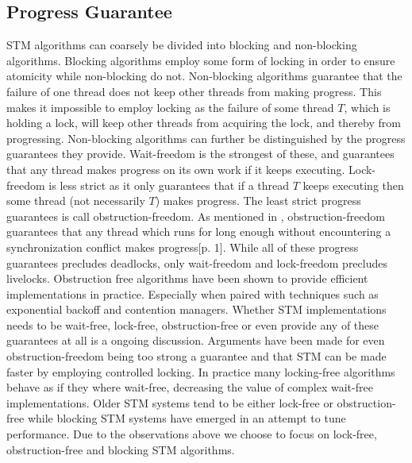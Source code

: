 \subsection{Progress Guarantee}
\ac{STM} algorithms can coarsely be divided into blocking and non-blocking algorithms\cite[p. 47]{harris2010transactional}. Blocking algorithms employ some form of locking in order to ensure atomicity while non-blocking do not\cite[p. 59]{herlihy2012art}. Non-blocking algorithms guarantee that the failure of one thread does not keep other threads from making progress\cite[p. 47]{harris2010transactional}\cite[p. 142]{herlihy1991wait}\cite[p. 59]{herlihy2012art}. This  makes it impossible to employ locking as the failure of some thread $T$, which is holding a lock, will keep other threads from acquiring the lock, and thereby from progressing. Non-blocking algorithms can further be distinguished by the progress guarantees they provide. Wait-freedom is the strongest of these, and guarantees that any thread makes progress on its own work if it keeps executing\cite[p. 124]{herlihy1991wait}\cite[p. 59]{herlihy2012art}. Lock-freedom is less strict as it only guarantees that if a thread $T$ keeps executing then some thread (not necessarily $T$) makes progress\cite[p. 47]{harris2010transactional}\cite[p. 60]{herlihy2012art}. The least strict progress guarantees is call obstruction-freedom\cite[p. 47]{harris2010transactional}\cite{herlihy2003obstruction}\cite[p. 61]{herlihy2012art}. As mentioned in , obstruction-freedom guarantees that any thread which runs for long enough without encountering a synchronization conflict makes progress\cite{herlihy2003obstruction}[p. 1]. While all of these progress guarantees precludes deadlocks, only wait-freedom and lock-freedom precludes livelocks\cite[p. 47]{harris2010transactional}. Obstruction free algorithms have been shown to provide efficient implementations in practice\cite[p. 61]{herlihy2012art}. Especially when paired with techniques such as exponential backoff\cite[p. 147]{herlihy2012art} and contention managers\cite[p. 51]{harris2010transactional}.  Whether \ac{STM} implementations needs to be wait-free, lock-free, obstruction-free or even provide any of these guarantees at all is a ongoing discussion. Arguments have been made for even obstruction-freedom being too strong a guarantee and that \ac{STM} can be made faster by employing controlled locking\cite{ennals2006software}. In practice many locking-free algorithms behave as if they where wait-free\cite{alistarh2014lock}, decreasing the value of complex wait-free implementations. Older \ac{STM} systems tend to be either lock-free or obstruction-free\cite[p. 47]{harris2010transactional} while blocking \ac{STM} systems have emerged in an attempt to tune performance\cite[p. 51]{harris2010transactional}. Due to the observations above we choose to focus on lock-free, obstruction-free and blocking \ac{STM} algorithms.


